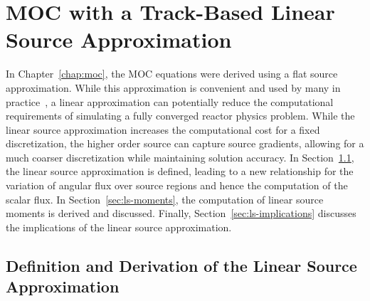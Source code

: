 \chapter{MOC with a Track-Based Linear Source Approximation}
\label{chap:linear-source}

In Chapter~\ref{chap:moc}, the MOC equations were derived using a flat source approximation. While this approximation is convenient and used by many in practice~\cite{moc-codes}, a linear approximation can potentially reduce the computational requirements of simulating a fully converged reactor physics problem. While the linear source approximation increases the computational cost for a fixed discretization, the higher order source can capture source gradients, allowing for a much coarser discretization while maintaining solution accuracy. In Section~\ref{sec:ls-scalar-flux}, the linear source approximation is defined, leading to a new relationship for the variation of angular flux over source regions and hence the computation of the scalar flux. In Section~\ref{sec:ls-moments}, the computation of linear source moments is derived and discussed. Finally, Section~\ref{sec:ls-implications} discusses the implications of the linear source approximation.

\section{Definition and Derivation of the Linear Source Approximation}
\label{sec:ls-scalar-flux}

